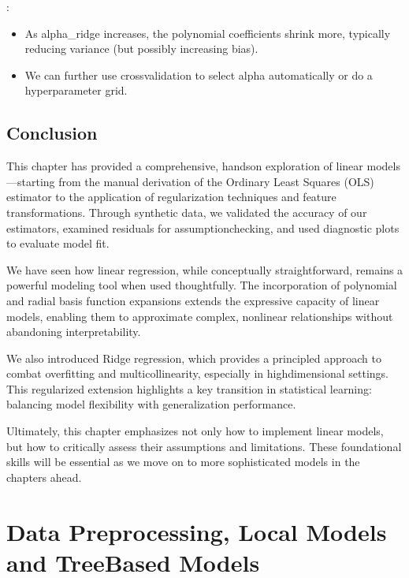 \documentclass[letterpaper,10pt,english]{jupyterBook}
\begin{document}
\sphinxAtStartPar
{}:
\begin{itemize}
\item {} 
\sphinxAtStartPar
As alpha\_ridge increases, the polynomial coefficients shrink more, typically reducing variance (but possibly increasing bias).

\item {} 
\sphinxAtStartPar
We can further use cross\sphinxhyphen{}validation to select alpha automatically or do a hyperparameter grid.

\end{itemize}


\section{Conclusion}
\label{\detokenize{02:conclusion}}
\sphinxAtStartPar
This chapter has provided a comprehensive, hands\sphinxhyphen{}on exploration of linear models—starting from the manual derivation of the Ordinary Least Squares (OLS) estimator to the application of regularization techniques and feature transformations. Through synthetic data, we validated the accuracy of our estimators, examined residuals for assumption\sphinxhyphen{}checking, and used diagnostic plots to evaluate model fit.

\sphinxAtStartPar
We have seen how linear regression, while conceptually straightforward, remains a powerful modeling tool when used thoughtfully. The incorporation of polynomial and radial basis function expansions extends the expressive capacity of linear models, enabling them to approximate complex, non\sphinxhyphen{}linear relationships without abandoning interpretability.

\sphinxAtStartPar
We also introduced Ridge regression, which provides a principled approach to combat overfitting and multicollinearity, especially in high\sphinxhyphen{}dimensional settings. This regularized extension highlights a key transition in statistical learning: balancing model flexibility with generalization performance.

\sphinxAtStartPar
Ultimately, this chapter emphasizes not only how to implement linear models, but how to critically assess their assumptions and limitations. These foundational skills will be essential as we move on to more sophisticated models in the chapters ahead.

\sphinxstepscope


\chapter{Data Preprocessing, Local Models and Tree\sphinxhyphen{}Based Models}
\label{\detokenize{03:data-preprocessing-local-models-and-tree-based-models}}\label{\detokenize{03::doc}}
\end{document}
